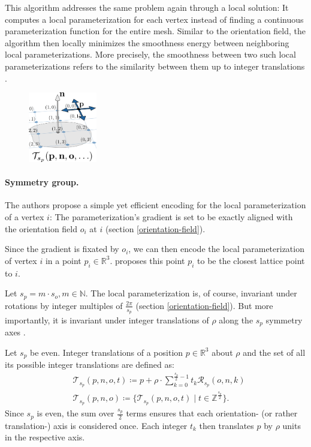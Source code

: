 \documentclass{ACGSeminar}
\begin{document}
This algorithm addresses the same problem again through a local solution: It computes a local parameterization for each vertex instead of finding a continuous parameterization function for the entire mesh. Similar to the orientation field, the algorithm then locally minimizes the smoothness energy between neighboring local parameterizations. More precisely, the smoothness between two such local parameterizations refers to the similarity between them up to integer translations \cite{jakob2015instant}.

\begin{figure}
	\includegraphics[width=3cm]{img/integer-translation.png}\par
	\label{fig:integer-translation}
\end{figure}

\paragraph{Symmetry group.}
The authors propose a simple yet efficient encoding for the local parameterization of a vertex $i$: The parameterization's gradient is set to be exactly aligned with the orientation field $o_i$ at $i$ (section \ref{orientation-field}).

Since the gradient is fixated by $o_i$, we can then encode the local parameterization of vertex $i$ in a point $p_i \in \mathbb{R}^3$. \cite{jakob2015instant} proposes this point $p_i$ to be the closest lattice point to $i$.

Let $s_p = m \cdot s_o, m \in \mathbb{N}$. The local parameterization is, of course, invariant under rotations by integer multiples of $\frac{2\pi}{s_p}$ (section \ref{orientation-field}). But more importantly, it is invariant under integer translations of $\rho$ along the $s_p$ symmetry axes \cite{jakob2015instant}.\bigskip

Let $s_p$ be even. Integer translations of a position $p \in \mathbb{R}^3$ about $\rho$ and the set of all its possible integer translations are defined as:
\begin{equation*}
\begin{split}
	& \mathcal{T}_{s_p}(p,n,o,t) \coloneqq p + \rho \cdot \sum_{k=0}^{\frac{s_p}{2}-1} t_k \mathcal{R}_{s_p}(o,n,k)\\
	& \mathcal{T}_{s_p}(p,n,o) \coloneqq \{\mathcal{T}_{s_p}(p,n,o,t) \mid t \in \mathbb{Z}^{\frac{s_p}{2}}\}.
\end{split}
\end{equation*}
Since $s_p$ is even, the sum over $\frac{s_p}{2}$ terms ensures that each orientation- (or rather translation-) axis is considered once. Each integer $t_k$ then translates $p$ by $\rho$ units in the respective axis.
\end{document}
